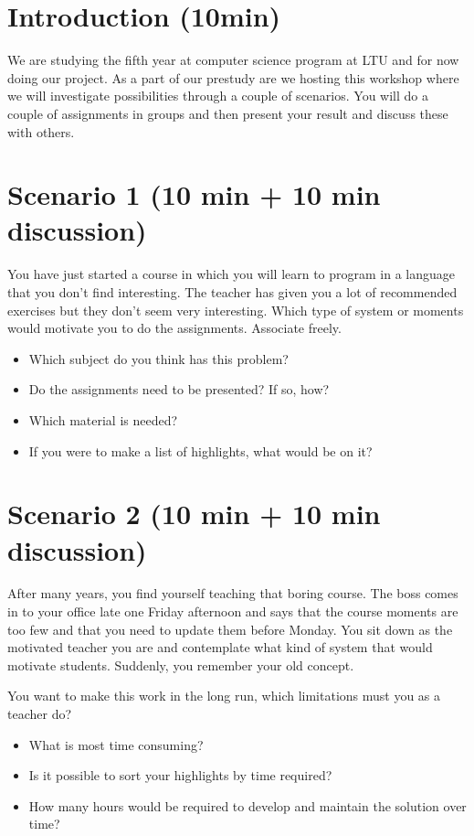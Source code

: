 \section*{Introduction (10min)}
We are studying the fifth year at computer science program at LTU and for now doing our project. As a part of our prestudy are we hosting this workshop where we will investigate possibilities through a couple of scenarios. You will do a couple of assignments in groups and then present your result and discuss these with others.

\section*{Scenario 1 (10 min + 10 min discussion)}
You have just started a course in which you will learn to program in a language that you don't find interesting. The teacher has given you a lot of recommended exercises but they don't seem very interesting. Which type of system or moments would motivate you to do the assignments. Associate freely.
\begin{itemize}
\item Which subject do you think has this problem?
\item Do the assignments need to be presented? If so, how?
\item Which material is needed?
\item If you were to make a list of highlights, what would be on it?
\end{itemize} 

\section*{Scenario 2 (10 min + 10 min discussion)}
After many years, you find yourself teaching that boring course. The boss comes in to your office late one Friday afternoon and says that the course moments are too few and that you need to update them before Monday. You sit down as the motivated teacher you are and contemplate what kind of system that would motivate students. Suddenly, you remember your old concept.

You want to make this work in the long run, which limitations must you as a teacher do?
\begin{itemize}
\item What is most time consuming?
\item Is it possible to sort your highlights by time required?
\item How many hours would be required to develop and maintain the solution over time?
\end{itemize} 

